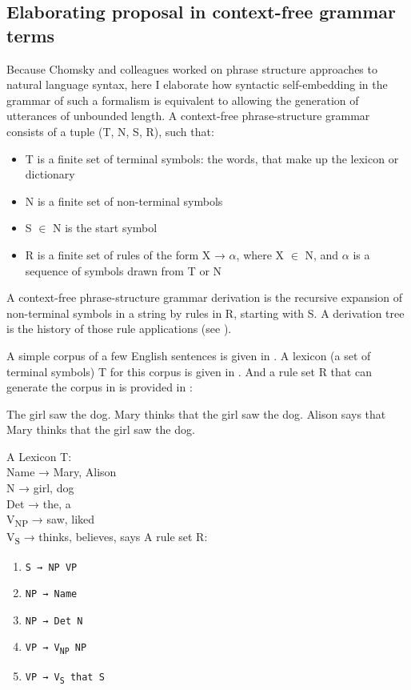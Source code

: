 \documentclass{article}
\begin{document}
\subsection{Elaborating  proposal in context-free grammar terms}

Because Chomsky and colleagues worked on phrase structure approaches to natural language syntax, here I elaborate how syntactic self-embedding in the grammar of such a formalism is equivalent to allowing the generation of utterances of unbounded length. A context-free phrase-structure grammar consists of a tuple (T, N, S, R), such that:

\begin{itemize}
    \item T is a finite set of terminal symbols: the words, that make up the lexicon or dictionary
    \item N is a finite set of non-terminal symbols
    \item S $\in$ N is the start symbol
    \item R is a finite set of rules of the form X → $\alpha$, where X $\in$ N, and $\alpha$ is a sequence of symbols drawn from T or N
\end{itemize}

A context-free phrase-structure grammar derivation is the recursive expansion of non-terminal symbols in a string by rules in R, starting with S. A derivation tree is the history of those rule applications (see \citealt{chomsky1959certain, lewis1998elements, hopcroft2001introduction}).

A simple corpus of a few English sentences is given in . A lexicon (a set of terminal symbols) T for this corpus is given in . And a rule set R that can generate the corpus in  is provided in :

\eal
\label{corpus1}
\ex\label{corpus1a} The girl saw the dog.
\ex\label{corpus1c} Mary thinks that the girl saw the dog.
\ex\label{corpus1d} Alison says that Mary thinks that the girl saw the dog.
\zl

\ea
\label{lexicon1}
A Lexicon T:\smallskip\\
{\ttfamily
Name → Mary, Alison\\
N → girl, dog\\
Det → the, a\\
V\textsubscript{NP} → saw, liked\\
V\textsubscript{S} → thinks, believes, says
}
\z
\pagebreak
\ea
\label{cfg1}
A rule set R:
\begin{multicols}{2}
\begin{enumerate}
\item \texttt{S → NP VP}
\item \texttt{NP → Name}
\item \texttt{NP → Det N}
\item \texttt{VP → V\textsubscript{NP} NP}
\item \texttt{VP → V\textsubscript{S} that S}
\end{enumerate}
\end{multicols}
\z
\end{document}
